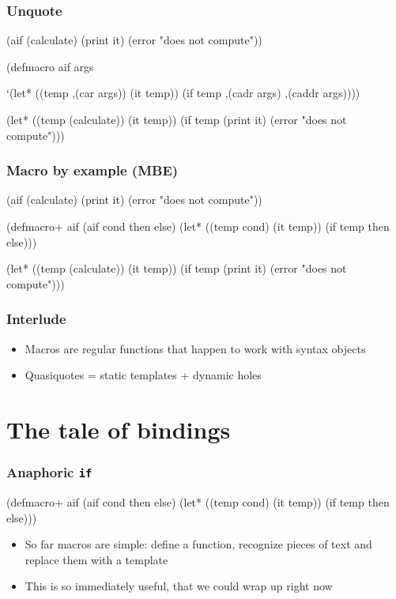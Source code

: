 \documentclass[hyperref={bookmarks=false}]{beamer}
\begin{document}
\begin{frame}[fragile]
\frametitle{Unquote}
\begin{semiverbatim}
(aif (calculate)
  (print it)
  (error "does not compute"))

(defmacro  aif args

 `(let* ((temp ,(car args))
         (it temp))
    (if temp
        ,(cadr args)
        ,(caddr args))))

(let* ((temp (calculate))
       (it temp))
  (if temp
    (print it)
    (error "does not compute")))
\end{semiverbatim}
\end{frame}

\begin{frame}[fragile]
\frametitle{Macro by example (MBE)}
\begin{semiverbatim}
(aif (calculate)
  (print it)
  (error "does not compute"))

(defmacro+ aif
  \alert{(aif cond then else)}
  (let* ((temp \alert{cond})
         (it temp))
    (if temp
        \alert{then}
        \alert{else})))

(let* ((temp (calculate))
       (it temp))
  (if temp
    (print it)
    (error "does not compute")))
\end{semiverbatim}
\end{frame}

\begin{frame}[fragile]
\frametitle{Interlude}
\begin{itemize}
\item Macros are regular functions that happen to work with syntax objects
\item Quasiquotes = static templates + dynamic holes
\end{itemize}
\end{frame}

\section{The tale of bindings}

\begin{frame}[fragile]
\frametitle{Anaphoric \texttt{if}}
\begin{semiverbatim}
(defmacro+ aif
  (aif cond then else)
  (let* ((temp cond)
         (it temp))
    (if temp then else)))
\end{semiverbatim}

\begin{itemize}
\item So far macros are simple: define a function, recognize pieces of text and replace them with a template
\item This is so immediately useful, that we could wrap up right now
\end{itemize}
\end{frame}
\end{document}

